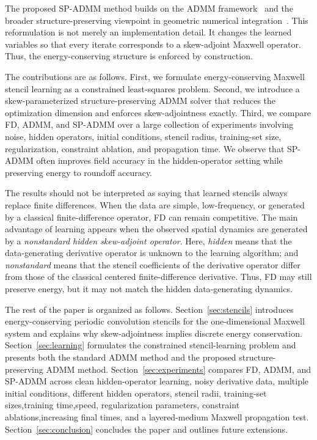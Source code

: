 \documentclass[11pt]{article}
\numberwithin{equation}{section}
\numberwithin{figure}{section}
\numberwithin{table}{section}
\begin{document}
The proposed SP-ADMM method builds on the ADMM framework~\cite{boyd2011admm}
and the broader structure-preserving viewpoint in geometric numerical
integration~\cite{lubich2006geometric}. This reformulation is not merely an implementation detail. It changes
the learned variables so that every iterate corresponds to a skew-adjoint
Maxwell operator. Thus, the energy-conserving structure is enforced by
construction.

The contributions are as follows. First, we formulate energy-conserving
Maxwell stencil learning as a constrained least-squares problem. Second, we
introduce a skew-parameterized structure-preserving ADMM solver that reduces
the optimization dimension and enforces skew-adjointness exactly. Third, we
compare FD, ADMM, and SP-ADMM over a large collection of experiments involving
noise, hidden operators, initial conditions, stencil radius, training-set size,
regularization, constraint ablation, and propagation time. We observe that SP-ADMM often improves field accuracy in the hidden-operator setting
while preserving energy to roundoff accuracy.

The results should not be interpreted as saying that learned stencils always
replace finite differences. When the data are simple, low-frequency, or
generated by a classical finite-difference operator, FD can remain
competitive. The main advantage of learning appears when the observed spatial
dynamics are generated by a \emph{nonstandard hidden skew-adjoint operator}.
Here, \emph{hidden} means that the data-generating derivative operator is unknown to the learning algorithm; and \emph{nonstandard} means that the
stencil coefficients of the derivative operator differ from those of the classical
centered finite-difference derivative. Thus, FD may still preserve energy,
but it may not match the hidden data-generating dynamics.

The rest of the paper is organized as follows.
Section~\ref{sec:stencils} introduces energy-conserving periodic convolution
stencils for the one-dimensional Maxwell system and explains why
skew-adjointness implies discrete energy conservation.
Section~\ref{sec:learning} formulates the constrained stencil-learning
problem and presents both the standard ADMM method and the proposed
structure-preserving ADMM method.
Section~\ref{sec:experiments} compares FD, ADMM, and SP-ADMM across clean
hidden-operator learning, noisy derivative data, multiple initial conditions,
different hidden operators, stencil radii, training-set sizes,training time,speed, regularization
parameters, constraint ablations,increasing final times, and a layered-medium Maxwell propagation test.
Section~\ref{sec:conclusion} concludes the paper and outlines future
extensions.
\end{document}
